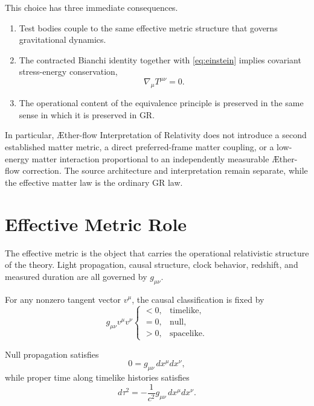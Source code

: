 \documentclass[11pt]{article}
\newcommand{\Aflow}{\AE{}ther-flow}
\newcommand{\TheoryName}{\Aflow{} Interpretation of Relativity}
\begin{document}
This choice has three immediate consequences.
\begin{enumerate}
    \item Test bodies couple to the same effective metric structure that governs gravitational dynamics.
    \item The contracted Bianchi identity together with \eqref{eq:einstein} implies covariant stress-energy conservation,
    \begin{equation}
    \nabla_{\mu}T^{\mu\nu}=0.
    \label{eq:conservation}
    \end{equation}
    \item The operational content of the equivalence principle is preserved in the same sense in which it is preserved in GR.
\end{enumerate}

In particular, \TheoryName{} does not introduce a second established matter
metric, a direct preferred-frame matter coupling, or a low-energy matter
interaction proportional to an independently measurable \Aflow{} correction.
The source architecture and interpretation remain separate, while the
effective matter law is the ordinary GR law.

\section{Effective Metric Role}

The effective metric is the object that carries the operational relativistic structure of the theory. Light propagation, causal structure, clock behavior, redshift, and measured duration are all governed by \(g_{\mu\nu}\).

For any nonzero tangent vector \(v^\mu\), the causal classification is fixed by
\begin{equation}
g_{\mu\nu}v^\mu v^\nu
\begin{cases}
<0, & \text{timelike},\\
=0, & \text{null},\\
>0, & \text{spacelike}.
\end{cases}
\label{eq:causalclassification}
\end{equation}

Null propagation satisfies
\begin{equation}
0=g_{\mu\nu}\,dx^{\mu}dx^{\nu},
\label{eq:null}
\end{equation}
while proper time along timelike histories satisfies
\begin{equation}
d\tau^2=-\frac{1}{c^2}g_{\mu\nu}\,dx^{\mu}dx^{\nu}.
\label{eq:propertime}
\end{equation}
\end{document}
